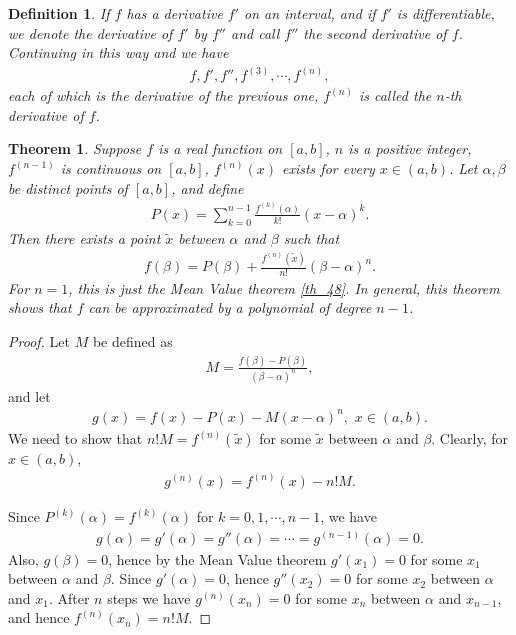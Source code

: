 \documentclass[10pt]{book}
\newtheorem{definition}{Definition}[chapter]
\newtheorem{theorem}{Theorem}[chapter]
\theoremstyle{definition}
\numberwithin{equation}{chapter}
\begin{document}
\begin{definition}
If $f$ has a derivative $f'$ on an interval, and if $f'$ is differentiable, we denote the derivative of $f'$ by $f''$ and call $f''$ the second derivative of $f$. Continuing in this way and we have
\begin{align*}
    f, f', f'', f^{(3)}, \cdots, f^{(n)},
\end{align*}
each of which is the derivative of the previous one, $f^{(n)}$ is called the $n$-th derivative of $f$.
\end{definition}

\medskip

\begin{theorem}
Suppose $f$ is a real function on $[a,b]$, $n$ is a positive integer, $f^{(n-1)}$ is continuous on $[a,b]$, $f^{(n)}(x)$ exists for every $x \in (a,b)$. Let $\alpha, \beta$ be distinct points of $[a,b]$, and define
\begin{align*}
    P(x) = \sum^{n-1}_{k=0} \frac{f^{(k)}(\alpha)}{k!} (x - \alpha)^k.
\end{align*}
Then there exists a point $\widetilde{x}$ between $\alpha$ and $\beta$ such that
\begin{align*}
    f(\beta) = P(\beta) + \frac{f^{(n)}(\widetilde{x})}{n!} (\beta - \alpha)^n.
\end{align*}
For $n = 1$, this is just the Mean Value theorem \ref{th_48}. In general, this theorem shows that $f$ can be approximated by a polynomial of degree $n - 1$.
\end{theorem}
\begin{proof}
Let $M$ be defined as 
\begin{align*}
    M = \frac{f(\beta) - P(\beta)}{(\beta - \alpha)^n},
\end{align*}
and let 
\begin{align*}
    g(x) = f(x) - P(x) - M(x - \alpha)^n, \,\, x \in (a,b).
\end{align*}
We need to show that $n!M = f^{(n)}(\widetilde{x})$ for some $\widetilde{x}$ between $\alpha$ and $\beta$. Clearly, for $x \in (a,b)$,
\begin{align*}
    g^{(n)}(x) = f^{(n)}(x) - n!M.
\end{align*}

Since $P^{(k)}(\alpha) = f^{(k)}(\alpha)$ for $k = 0,1,\cdots,n-1$, we have
\begin{align*}
    g(\alpha) = g'(\alpha) = g''(\alpha) = \cdots = g^{(n-1)}(\alpha) = 0.
\end{align*}
Also, $g(\beta) = 0$, hence by the Mean Value theorem $g'(x_1) = 0$ for some $x_1$ between $\alpha$ and $\beta$. Since $g'(\alpha) = 0$, hence $g''(x_2) = 0$ for some $x_2$ between $\alpha$ and $x_1$. After $n$ steps we have $g^{(n)}(x_n) = 0$ for some $x_n$ between $\alpha$ and $x_{n-1}$, and hence $f^{(n)}(x_n) = n!M$.
\end{proof}
\end{document}
